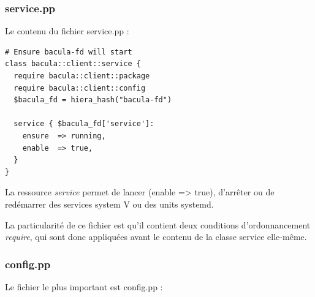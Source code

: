 \documentclass[14 pt,a4paper]{extreport}
\begin{document}
\subsubsection*{service.pp}

Le contenu du fichier service.pp :

\begin{framed}
\begin{Verbatim}[fontsize=\scriptsize]
# Ensure bacula-fd will start
class bacula::client::service {
  require bacula::client::package
  require bacula::client::config
  $bacula_fd = hiera_hash("bacula-fd")

  service { $bacula_fd['service']:
    ensure  => running,
    enable  => true,
  }
}\end{Verbatim}
\end{framed}

La ressource \emph{service} permet de lancer (enable => true), d'arrêter ou de redémarrer des services system V ou des units systemd.

La particularité de ce fichier est qu'il contient deux conditions d'ordonnancement \emph{require}, qui sont donc appliquées avant le contenu de la classe service elle-même.

\subsubsection*{config.pp}

Le fichier le plus important est config.pp : 
\end{document}
